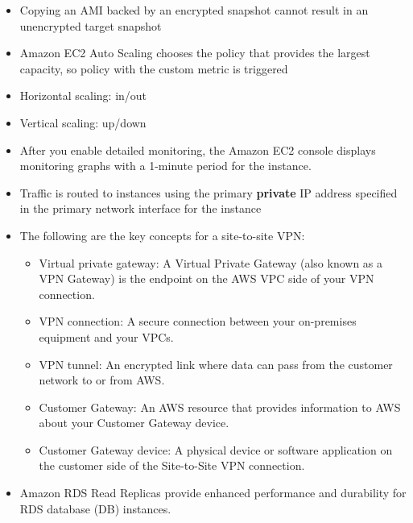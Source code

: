 \documentclass[]{scrartcl}
\begin{document}
\begin{itemize}
	\item Copying an AMI backed by an encrypted snapshot cannot result in an unencrypted target snapshot
	\item Amazon EC2 Auto Scaling chooses the policy that provides the largest capacity, so policy with the custom metric is triggered
	\item Horizontal scaling: in/out
	\item Vertical scaling: up/down
	\item After you enable detailed monitoring, the Amazon EC2 console displays monitoring graphs with a 1-minute period for the instance.
	\item Traffic is routed to instances using the primary \textbf{private} IP address specified in the primary network interface for the instance
	\item The following are the key concepts for a site-to-site VPN:
	\begin{itemize}
		\item Virtual private gateway: A Virtual Private Gateway (also known as a VPN Gateway) is the endpoint on the AWS VPC side of your VPN connection.
		\item VPN connection: A secure connection between your on-premises equipment and your VPCs.
		\item VPN tunnel: An encrypted link where data can pass from the customer network to or from AWS.
		\item Customer Gateway: An AWS resource that provides information to AWS about your Customer Gateway device.
		\item Customer Gateway device: A physical device or software application on the customer side of the Site-to-Site VPN connection.
	\end{itemize}
	\item Amazon RDS Read Replicas provide enhanced performance and durability for RDS database (DB) instances. 
\end{itemize}
\end{document}
